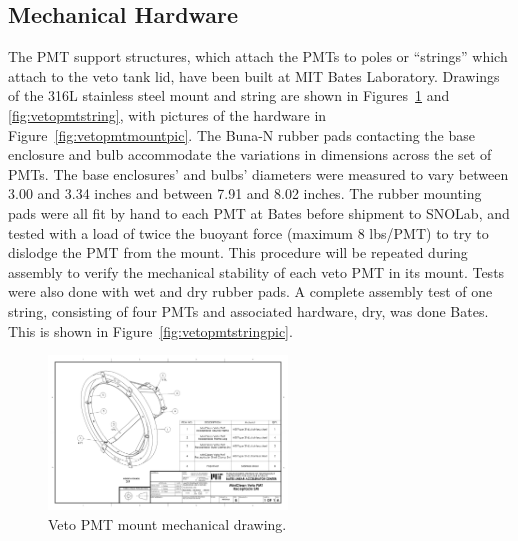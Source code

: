 \documentclass{JINST}
\begin{document}


\subsection{Mechanical Hardware}
%
The PMT support structures, which attach the PMTs to poles or
``strings'' which attach to the veto tank lid, have been built at
MIT Bates Laboratory. Drawings of the 316L stainless steel
mount and string are shown in Figures~\ref{fig:vetopmtmount} and
\ref{fig:vetopmtstring}, with pictures of the hardware in
Figure~\ref{fig:vetopmtmountpic}. The Buna-N rubber pads contacting
the base enclosure and bulb accommodate the variations in dimensions
across the set of PMTs. The base enclosures' and bulbs' diameters were
measured to vary between 3.00 and 3.34 inches and between 7.91 and
8.02 inches. The rubber mounting pads were all fit by hand to each PMT
at Bates before shipment to SNOLab, and tested with a load of twice
the buoyant force (maximum 8 lbs/PMT) to try to dislodge the PMT from
the mount.  This procedure will be repeated during assembly to verify
the mechanical stability of each veto PMT in its mount.  Tests were
also done with wet and dry rubber pads.  A complete assembly test of
one string, consisting of four PMTs and associated hardware, dry, was done
Bates.  This is shown in Figure~\ref{fig:vetopmtstringpic}.

\begin{figure}[ht]
\begin{center}
\includegraphics[width=2.5in,angle=0]{graphics/vetopmtmount.pdf}
\caption{Veto PMT mount mechanical drawing.
\label{fig:vetopmtmount}}
\end{center}
\end{figure}
\end{document}
